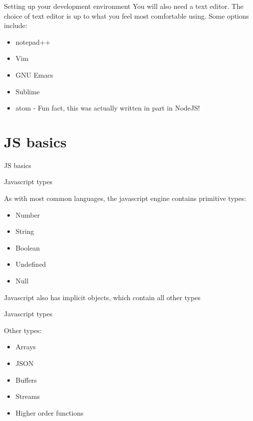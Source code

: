 \documentclass{beamer}
\begin{document}
\begin{frame}{Setting up your development environment}
You will also need a text editor. The choice of text editor is up to what you feel most comfortable using.
\pause
Some options include:
\begin{itemize}
  \pause
  \item notepad++
  \pause
  \item Vim
  \pause
  \item GNU Emacs
  \pause
  \item Sublime
  \pause
  \item atom \pause - Fun fact, this was actually written in part in NodeJS!
\end{itemize}
\end{frame}

\section{JS basics}

\begin{frame}{JS basics}

\end{frame}

\begin{frame}{Javascript types}

As with most common languages, the javascript engine contains primitive types:
\pause
\begin{itemize}
 \item Number\pause 
 \item String\pause
 \item Boolean\pause
 \item Undefined\pause
 \item Null
\end{itemize}
\pause
Javascript also has implicit objects, which contain all other types

\end{frame}

\begin{frame}{Javascript types}

Other types:
\pause
\begin{itemize}
 \item Arrays\pause 
 \item JSON\pause
 \item Buffers\pause
 \item Streams\pause
 \item Higher order functions
\end{itemize}

\end{frame}
\end{document}
